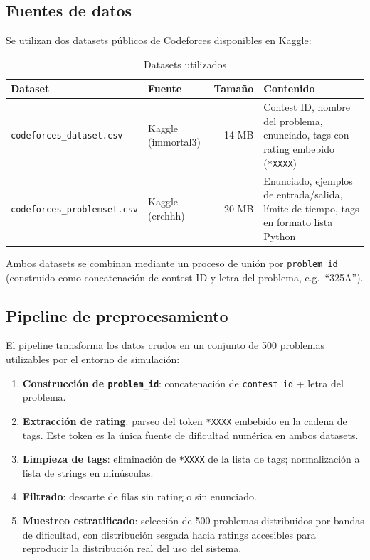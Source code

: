 \documentclass[12pt, a4paper]{article}
\begin{document}
\subsection{Fuentes de datos}

Se utilizan dos datasets públicos de Codeforces disponibles en Kaggle:

\begin{table}[H]
\centering
\caption{Datasets utilizados}
\begin{tabular}{llrp{6cm}}
\toprule
\textbf{Dataset} & \textbf{Fuente} & \textbf{Tamaño} & \textbf{Contenido} \\
\midrule
\texttt{codeforces\_dataset.csv} & Kaggle (immortal3) & 14 MB &
  Contest ID, nombre del problema, enunciado, tags con rating embebido (\texttt{*XXXX}) \\
\texttt{codeforces\_problemset.csv} & Kaggle (erchhh) & 20 MB &
  Enunciado, ejemplos de entrada/salida, límite de tiempo, tags en formato lista Python \\
\bottomrule
\end{tabular}
\end{table}

Ambos datasets se combinan mediante un proceso de unión por \texttt{problem\_id}
(construido como concatenación de contest ID y letra del problema, e.g.\ ``325A'').

\subsection{Pipeline de preprocesamiento}

El pipeline transforma los datos crudos en un conjunto de 500 problemas
utilizables por el entorno de simulación:

\begin{enumerate}
  \item \textbf{Construcción de \texttt{problem\_id}}: concatenación de
    \texttt{contest\_id} + letra del problema.
  \item \textbf{Extracción de rating}: parseo del token \texttt{*XXXX} embebido
    en la cadena de tags. Este token es la única fuente de dificultad
    numérica en ambos datasets.
  \item \textbf{Limpieza de tags}: eliminación de \texttt{*XXXX} de la lista
    de tags; normalización a lista de strings en minúsculas.
  \item \textbf{Filtrado}: descarte de filas sin rating o sin enunciado.
  \item \textbf{Muestreo estratificado}: selección de 500 problemas
    distribuidos por bandas de dificultad, con distribución sesgada hacia
    ratings accesibles para reproducir la distribución real del uso del
    sistema.
\end{enumerate}
\end{document}
